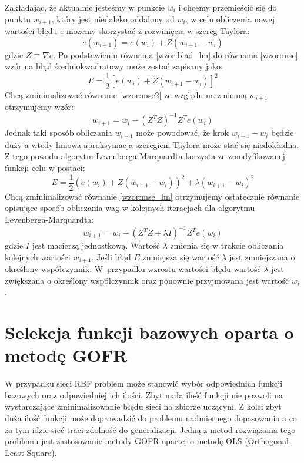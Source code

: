 Zakładając, że aktualnie jesteśmy w punkcie $w_{i}$ i chcemy przemieścić się do punktu $w_{i+1}$, który jest niedaleko oddalony od $w_{i}$, w celu obliczenia nowej wartości błędu $e$ możemy skorzystać z rozwinięcia w szereg Taylora:
\begin{equation}
	\label{wzor:blad_lm}
	e(w_{i+1}) = e(w_{i}) + Z(w_{i+1} - w_{i})
\end{equation}
gdzie $Z \equiv \nabla e$. Po podstawieniu równania \ref{wzor:blad_lm} do równania \ref{wzor:mse} wzór na błąd średniokwadratowy może zostać zapisany jako:
\begin{equation}
	\label{wzor:mse2}
	E = \frac{1}{2}[e(w_{i}) + Z(w_{i+1} - w_{i})]^2
\end{equation}
Chcą zminimalizować równanie \ref{wzor:mse2} ze względu na zmienną $w_{i+1}$ otrzymujemy wzór:
\begin{equation}
	w_{i+1} = w_{i} - (Z^TZ)^{-1}Z^Te(w_{i})
\end{equation}
Jednak taki sposób obliczania $w_{i+1}$ może powodować, że krok $w_{i+1} - w_{i}$ będzie duży a wtedy liniowa aproksymacja szeregiem Taylora może stać się niedokładna. Z tego powodu algorytm Levenberga-Marquardta korzysta ze zmodyfikowanej funkcji celu w postaci:
\begin{equation}
	\label{wzor:mse_lm}
	E = \frac{1}{2}(e(w_{i}) + Z(w_{i+1} - w_{i}))^2 + \lambda (w_{i+1} - w_{i})^2
\end{equation}
Chcą zminimalizować równanie \ref{wzor:mse_lm} otrzymujemy ostatecznie równanie opisujące sposób obliczania wag w kolejnych iteracjach dla algorytmu Levenberga-Marquardta:
\begin{equation}
	w_{i+1} = w_{i} -(Z^TZ + \lambda I)^{-1}Z^Te(w_{i})
\end{equation}
gdzie $I$ jest macierzą jednostkową. Wartość $\lambda$ zmienia się w trakcie obliczania kolejnych wartości $w_{i+1}$. Jeśli błąd $E$ zmniejsza się wartość $\lambda$ jest zmniejszana o określony współczynnik. W~przypadku wzrostu wartości błędu wartość $\lambda$ jest zwiększana o określony współczynnik oraz ponownie przyjmowana jest wartość $w_i$.



\newpage
\section{Selekcja funkcji bazowych oparta o metodę GOFR}
W przypadku sieci RBF problem może stanowić wybór odpowiednich funkcji bazowych oraz odpowiedniej ich ilości. Zbyt mała ilość funkcji nie pozwoli na wystarczające zminimalizowanie błędu sieci na zbiorze uczącym. Z kolei zbyt duża ilość funkcji może doprowadzić do problemu nadmiernego dopasowania a co za tym idzie sieć traci zdolność do generalizacji. Jedną z metod rozwiązania tego problemu jest zastosowanie metody GOFR opartej o metodę OLS (Orthogonal Least Square). 

